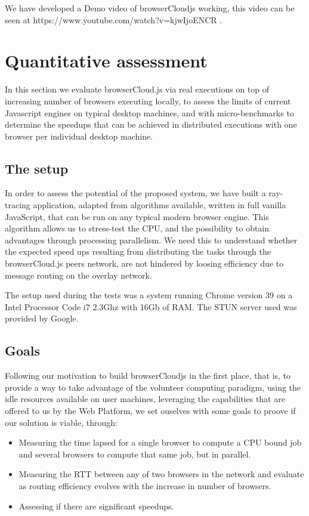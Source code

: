 We have developed a Demo video of browserCloudjs working, this video can be seen at https://www.youtube.com/watch?v=kjwIjoENCR .

\section{Quantitative assessment}

In this section we evaluate browserCloud.js via real executions on top of increasing number of browsers executing locally, to assess the limits of current Javascript engines on typical desktop machines, and with micro-benchmarks to determine the speedups that can be achieved in distributed executions with one browser per individual desktop machine.

\subsection{The setup}

In order to assess the potential of the proposed system, we have built a ray-tracing application, adapted from algorithms available, written in full vanilla JavaScript, that can be run on any typical modern browser engine. This algorithm allows us to stress-test the CPU,  and the possibility to obtain advantages through processing parallelism. We need this to understand whether the expected speed ups resulting from distributing the tasks through the browserCloud.js peers network, are not hindered by loosing efficiency due to message routing on the overlay network.

The setup used during the tests was a system running Chrome version 39 on a Intel Processor Code i7 2.3Ghz with 16Gb of RAM. The STUN server used was provided by Google.

\subsection{Goals}

Following our motivation to build browserCloudjs in the first place, that is, to provide a way to take advantage of the volunteer computing paradigm, using the idle resources available on user machines, leveraging the capabilities that are offered to us by the Web Platform, we set ouselves with some goals to proove if our solution is viable, through:

\begin{itemize}
    \item Measuring the time lapsed for a single browser to compute a CPU bound job and several browsers to compute that same job, but in parallel.
    \item Measuring the RTT between any of two browsers in the network and evaluate as routing efficiency evolves with the increase in number of browsers.
    \item Assessing if there are significant speedups.
\end{itemize}

